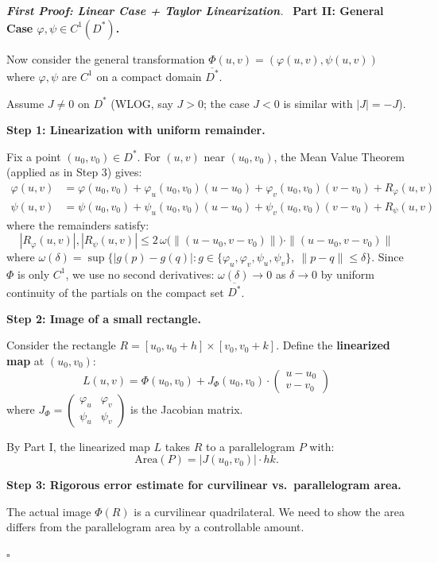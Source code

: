 \documentclass[11pt]{report}
\renewenvironment{proof}[1][Proof]{\par\noindent\textit{#1.}\ }{\hfill$\square$\par\medskip}
\begin{document}
\begin{proof}[\textbf{First Proof: Linear Case + Taylor Linearization}]
\textbf{Part II: General Case $\varphi, \psi \in C^1(D^*)$.}

Now consider the general transformation $\Phi(u, v) = (\varphi(u, v), \psi(u, v))$ where $\varphi, \psi$ are $C^1$ on a compact domain $\overline{D^*}$.

Assume $J \neq 0$ on $D^*$ (WLOG, say $J > 0$; the case $J < 0$ is similar with $|J| = -J$).

\textbf{Step 1: Linearization with uniform remainder.}

Fix a point $(u_0, v_0) \in D^*$. For $(u, v)$ near $(u_0, v_0)$, the Mean Value Theorem (applied as in Step 3) gives:
\begin{align*}
\varphi(u, v) &= \varphi(u_0, v_0) + \varphi_u(u_0, v_0)(u - u_0) + \varphi_v(u_0, v_0)(v - v_0) + R_\varphi(u, v) \\
\psi(u, v) &= \psi(u_0, v_0) + \psi_u(u_0, v_0)(u - u_0) + \psi_v(u_0, v_0)(v - v_0) + R_\psi(u, v)
\end{align*}
where the remainders satisfy:
\[
|R_\varphi(u, v)|, |R_\psi(u, v)| \leq 2\,\omega\big(\|(u - u_0, v - v_0)\|\big) \cdot \|(u - u_0, v - v_0)\|
\]
where $\omega(\delta) = \sup\{|g(p) - g(q)| : g \in \{\varphi_u, \varphi_v, \psi_u, \psi_v\},\ \|p - q\| \leq \delta\}$. Since $\Phi$ is only $C^1$, we use no second derivatives: $\omega(\delta) \to 0$ as $\delta \to 0$ by uniform continuity of the partials on the compact set $\overline{D^*}$.

\textbf{Step 2: Image of a small rectangle.}

Consider the rectangle $R = [u_0, u_0 + h] \times [v_0, v_0 + k]$. Define the \textbf{linearized map} at $(u_0, v_0)$:
\[
L(u, v) = \Phi(u_0, v_0) + J_\Phi(u_0, v_0) \cdot \begin{pmatrix} u - u_0 \\ v - v_0 \end{pmatrix}
\]
where $J_\Phi = \begin{pmatrix} \varphi_u & \varphi_v \\ \psi_u & \psi_v \end{pmatrix}$ is the Jacobian matrix.

By Part I, the linearized map $L$ takes $R$ to a parallelogram $P$ with:
\[
\text{Area}(P) = |J(u_0, v_0)| \cdot hk.
\]

\textbf{Step 3: Rigorous error estimate for curvilinear vs.\ parallelogram area.}

The actual image $\Phi(R)$ is a curvilinear quadrilateral. We need to show the area differs from the parallelogram area by a controllable amount.


\end{proof}
\end{document}
